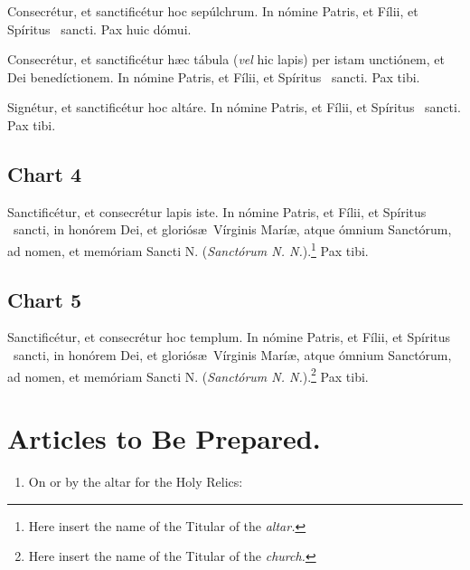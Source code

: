 \documentclass[letterpaper]{report}
\begin{document}
{    Conse\cross cr\'etur, et sancti\cross fic\'etur hoc sep\'ulchrum. In
    n\'omine Pa\cross tris, et F\'i\cross lii, et Sp\'iritus \cross\ sancti.
    Pax huic d\'omui.

    Conse\cross cr\'etur, et sancti\cross fic\'etur h\ae c t\'abula
    (\textit{vel} hic lapis) per istam uncti\'onem, et Dei bened\'ictionem. In
    n\'omine Pa\cross tris, et F\'i\cross lii, et Sp\'iritus \cross\ sancti.
    Pax tibi.

    Sign\'e\cross tur, et sancti\cross fic\'etur hoc alt\'are. In n\'omine
    Pa\cross tris, et F\'i\cross lii, et Sp\'iritus \cross\ sancti. Pax tibi.

    \subsection*{Chart 4}

    Sancti\cross fic\'etur, et conse\cross cr\'etur lapis iste. In n\'omine
    Pa\cross tris, et F\'i\cross lii, et Sp\'iritus \cross\ sancti, in
    hon\'orem Dei, et glori\'os\ae\ V\'irginis Mar\'i\ae, atque \'omnium
    Sanct\'orum, ad nomen, et mem\'oriam Sancti N. (\textit{Sanct\'orum N.
    N.}).\footnote{Here insert the name of the Titular of the \textit{altar.}}
    Pax tibi.

    \subsection*{Chart 5}

    Sancti\cross fic\'etur, et conse\cross cr\'etur hoc templum. In n\'omine
    Pa\cross tris, et F\'i\cross lii, et Sp\'iritus \cross\ sancti, in
    hon\'orem Dei, et glori\'os\ae\ V\'irginis Mar\'i\ae, atque \'omnium
    Sanct\'orum, ad nomen, et mem\'oriam Sancti N. (\textit{Sanct\'orum N.
    N.}).\footnote{Here insert the name of the Titular of the \textit{church.}}
    Pax tibi.

    \section{Articles to Be Prepared.}

    \begin{enumerate}[label=\Roman*.]

        \item On or by the altar for the Holy Relics:

            \begin{enumerate}[lable=\arabic*.]


\end{enumerate}
\end{enumerate}}
\end{document}
